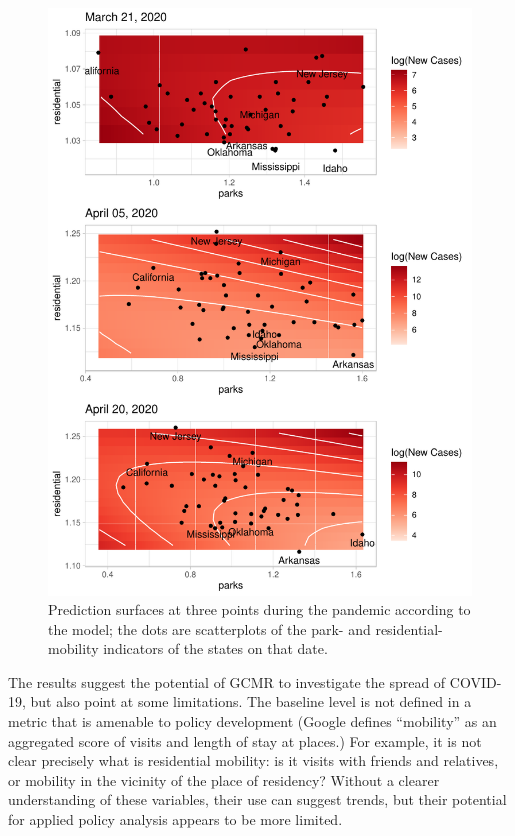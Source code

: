 \documentclass[]{elsarticle} %
\makeatletter
\def\maxwidth{\ifdim\Gin@nat@width>\linewidth\linewidth
\else\Gin@nat@width\fi}
\let\Oldincludegraphics\includegraphics
\renewcommand{\includegraphics}[1]{\Oldincludegraphics[width=\maxwidth]{#1}}
\makeatother
\begin{document}
\begin{figure}
\centering
\includegraphics{Covid-19-Google-CMR-US_files/figure-latex/prediction-plots-1.pdf}
\caption{\label{fig:prediction-plots}Prediction surfaces at three points
during the pandemic according to the model; the dots are scatterplots of
the park- and residential-mobility indicators of the states on that
date.}
\end{figure}

The results suggest the potential of GCMR to investigate the spread of
COVID-19, but also point at some limitations. The baseline level is not
defined in a metric that is amenable to policy development (Google
defines ``mobility'' as an aggregated score of visits and length of stay
at places.) For example, it is not clear precisely what is residential
mobility: is it visits with friends and relatives, or mobility in the
vicinity of the place of residency? Without a clearer understanding of
these variables, their use can suggest trends, but their potential for
applied policy analysis appears to be more limited.
\end{document}
